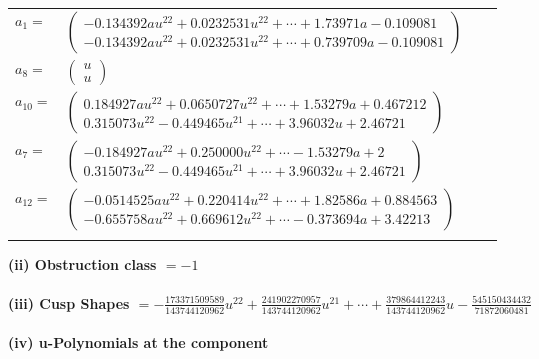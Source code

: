 \documentclass[1p]{elsarticle_modified}
\theoremstyle{definition}
\begin{document}
\begin{tabular}{m{7pt} m{180pt} m{7pt} m{180pt} }
\flushright $a_{1}=$&$\begin{pmatrix}-0.134392 a u^{22}+0.0232531 u^{22}+\cdots+1.73971 a-0.109081\\-0.134392 a u^{22}+0.0232531 u^{22}+\cdots+0.739709 a-0.109081\end{pmatrix}$ \\
\flushright $a_{8}=$&$\begin{pmatrix}u\\u\end{pmatrix}$ \\
\flushright $a_{10}=$&$\begin{pmatrix}0.184927 a u^{22}+0.0650727 u^{22}+\cdots+1.53279 a+0.467212\\0.315073 u^{22}-0.449465 u^{21}+\cdots+3.96032 u+2.46721\end{pmatrix}$ \\
\flushright $a_{7}=$&$\begin{pmatrix}-0.184927 a u^{22}+0.250000 u^{22}+\cdots-1.53279 a+2\\0.315073 u^{22}-0.449465 u^{21}+\cdots+3.96032 u+2.46721\end{pmatrix}$ \\
\flushright $a_{12}=$&$\begin{pmatrix}-0.0514525 a u^{22}+0.220414 u^{22}+\cdots+1.82586 a+0.884563\\-0.655758 a u^{22}+0.669612 u^{22}+\cdots-0.373694 a+3.42213\end{pmatrix}$\\&\end{tabular}
\flushleft \textbf{(ii) Obstruction class $= -1$}\\~\\
\flushleft \textbf{(iii) Cusp Shapes $= -\frac{173371509589}{143744120962} u^{22}+\frac{241902270957}{143744120962} u^{21}+\cdots+\frac{379864412243}{143744120962} u-\frac{545150434432}{71872060481}$}\\~\\
\newpage\renewcommand{\arraystretch}{1}
\flushleft \textbf{(iv) u-Polynomials at the component}\newline \\
\end{document}
